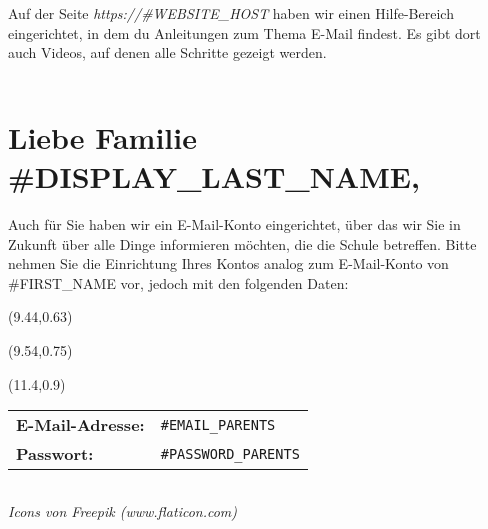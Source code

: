 Auf der Seite {\em https:/\hspace*{-0.5mm}/#{WEBSITE_HOST}} haben wir einen Hilfe-Bereich eingerichtet, in dem du Anleitungen zum Thema E-Mail findest. Es gibt dort auch Videos, auf denen alle Schritte gezeigt werden.

\begin{tabularx}{\textwidth}{p{3cm}X}
\hline
\end{tabularx}

\section*{Liebe Familie #{DISPLAY_LAST_NAME},}

Auch für Sie haben wir ein E-Mail-Konto eingerichtet, über das wir Sie in Zukunft über alle Dinge informieren möchten, die die Schule betreffen. Bitte nehmen Sie die Einrichtung Ihres Kontos analog zum E-Mail-Konto von #{FIRST_NAME} vor, jedoch mit den folgenden Daten:

\begin{textblock}{4}(9.44,0.63)
\begin{turn}{-5}

\end{turn}
\end{textblock}

\begin{textblock}{4}(9.54,0.75)
\begin{turn}{-5}
\end{turn}
\vspace*{10mm}
\end{textblock}

\begin{textblock}{4}(11.4,0.9)
\scalebox{0.12}{}
\end{textblock}

\vspace*{1mm}
\begin{tabularx}{\textwidth}{p{3cm}X}
\hline
{\bf E-Mail-Adresse:} & {\tt #{EMAIL_PARENTS}} \\
{\bf Passwort:} & {\tt #{PASSWORD_PARENTS}} \\
\end{tabularx}
\begin{tabularx}{0.75\textwidth}{p{3cm}X}
\hline
\end{tabularx}

\vspace*{5mm}

\vfill
{\hfill\small\em Icons von Freepik (www.flaticon.com)}
